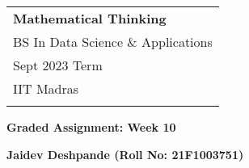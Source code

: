 \documentclass[a4paper,12pt]{article} %
\begin{document}
\thispagestyle{empty} %

\begin{tabular}{p{15.5cm}} %
{\large \bf Mathematical Thinking} \\
BS In Data Science \& Applications  \\ Sept 2023 Term  \\ IIT Madras\\
\hline %
\\
\end{tabular} %

\vspace*{0.3cm} %

\begin{center} %
	{\Large \bf Graded Assignment: Week 10} %
	\vspace{2mm}

	{\bf Jaidev Deshpande (Roll No: 21F1003751)} %

\end{center}

\vspace{0.4cm}
\end{document}
